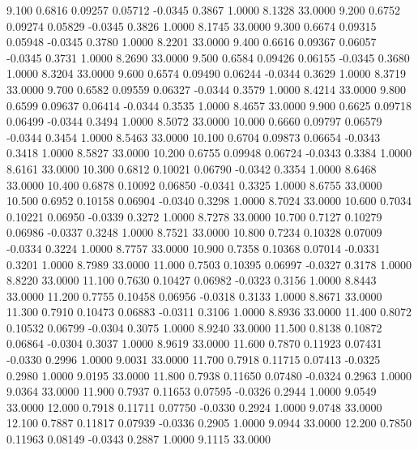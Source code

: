    9.100   0.6816   0.09257   0.05712  -0.0345   0.3867   1.0000   8.1328  33.0000
   9.200   0.6752   0.09274   0.05829  -0.0345   0.3826   1.0000   8.1745  33.0000
   9.300   0.6674   0.09315   0.05948  -0.0345   0.3780   1.0000   8.2201  33.0000
   9.400   0.6616   0.09367   0.06057  -0.0345   0.3731   1.0000   8.2690  33.0000
   9.500   0.6584   0.09426   0.06155  -0.0345   0.3680   1.0000   8.3204  33.0000
   9.600   0.6574   0.09490   0.06244  -0.0344   0.3629   1.0000   8.3719  33.0000
   9.700   0.6582   0.09559   0.06327  -0.0344   0.3579   1.0000   8.4214  33.0000
   9.800   0.6599   0.09637   0.06414  -0.0344   0.3535   1.0000   8.4657  33.0000
   9.900   0.6625   0.09718   0.06499  -0.0344   0.3494   1.0000   8.5072  33.0000
  10.000   0.6660   0.09797   0.06579  -0.0344   0.3454   1.0000   8.5463  33.0000
  10.100   0.6704   0.09873   0.06654  -0.0343   0.3418   1.0000   8.5827  33.0000
  10.200   0.6755   0.09948   0.06724  -0.0343   0.3384   1.0000   8.6161  33.0000
  10.300   0.6812   0.10021   0.06790  -0.0342   0.3354   1.0000   8.6468  33.0000
  10.400   0.6878   0.10092   0.06850  -0.0341   0.3325   1.0000   8.6755  33.0000
  10.500   0.6952   0.10158   0.06904  -0.0340   0.3298   1.0000   8.7024  33.0000
  10.600   0.7034   0.10221   0.06950  -0.0339   0.3272   1.0000   8.7278  33.0000
  10.700   0.7127   0.10279   0.06986  -0.0337   0.3248   1.0000   8.7521  33.0000
  10.800   0.7234   0.10328   0.07009  -0.0334   0.3224   1.0000   8.7757  33.0000
  10.900   0.7358   0.10368   0.07014  -0.0331   0.3201   1.0000   8.7989  33.0000
  11.000   0.7503   0.10395   0.06997  -0.0327   0.3178   1.0000   8.8220  33.0000
  11.100   0.7630   0.10427   0.06982  -0.0323   0.3156   1.0000   8.8443  33.0000
  11.200   0.7755   0.10458   0.06956  -0.0318   0.3133   1.0000   8.8671  33.0000
  11.300   0.7910   0.10473   0.06883  -0.0311   0.3106   1.0000   8.8936  33.0000
  11.400   0.8072   0.10532   0.06799  -0.0304   0.3075   1.0000   8.9240  33.0000
  11.500   0.8138   0.10872   0.06864  -0.0304   0.3037   1.0000   8.9619  33.0000
  11.600   0.7870   0.11923   0.07431  -0.0330   0.2996   1.0000   9.0031  33.0000
  11.700   0.7918   0.11715   0.07413  -0.0325   0.2980   1.0000   9.0195  33.0000
  11.800   0.7938   0.11650   0.07480  -0.0324   0.2963   1.0000   9.0364  33.0000
  11.900   0.7937   0.11653   0.07595  -0.0326   0.2944   1.0000   9.0549  33.0000
  12.000   0.7918   0.11711   0.07750  -0.0330   0.2924   1.0000   9.0748  33.0000
  12.100   0.7887   0.11817   0.07939  -0.0336   0.2905   1.0000   9.0944  33.0000
  12.200   0.7850   0.11963   0.08149  -0.0343   0.2887   1.0000   9.1115  33.0000
